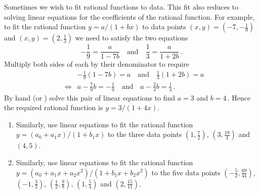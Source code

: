 \begin{OmitV1}
\begin{exercise}  
Sometimes we wish to fit rational functions to data.
This fit also reduces to solving linear equations for the coefficients of the rational function.
For example, to fit the rational function \(y=a/(1+bx)\) to data points \((x,y)=(-7,-\frac19)\) and \((x,y)=(2,\frac13)\) we need to satisfy the two equations
\begin{equation*}
-\frac19=\frac a{1-7b} \quad\text{and}\quad
\frac13=\frac a{1+2b}\,.
\end{equation*}
Multiply both sides of each by their denominator to require
\begin{eqnarray*}
&&-\tfrac19(1-7b)= a \quad\text{and}\quad
\tfrac13(1+2b)= a
\\&\iff& a-\tfrac79b=-\tfrac19 \quad\text{and}\quad
a-\tfrac23 b=\tfrac13\,.
\end{eqnarray*}
By hand (or \script) solve this pair of linear equations to find \(a=3\) and \(b=4\)\,.
Hence the required rational function is \(y=3/(1+4x)\).
\begin{enumerate}
\item Similarly, use linear equations to fit the rational function \(y=(a_0+a_1x)/(1+b_1x)\) to the three data points \((1,\tfrac72)\), \((3,\tfrac{19}4)\) and \((4,5)\).

\item Similarly, use linear equations to fit the rational function \(y=(a_0+a_1x+a_2x^2)/(1+b_1x+b_2x^2)\) to the five data points 
\((-\tfrac52,\tfrac{69}{44})\), \((-1,\tfrac{3}2)\), \((\tfrac12,\tfrac98)\), \((1,\tfrac54)\) and \((2,\tfrac{15}{11})\).
\end{enumerate}
\end{exercise}
\end{OmitV1}

